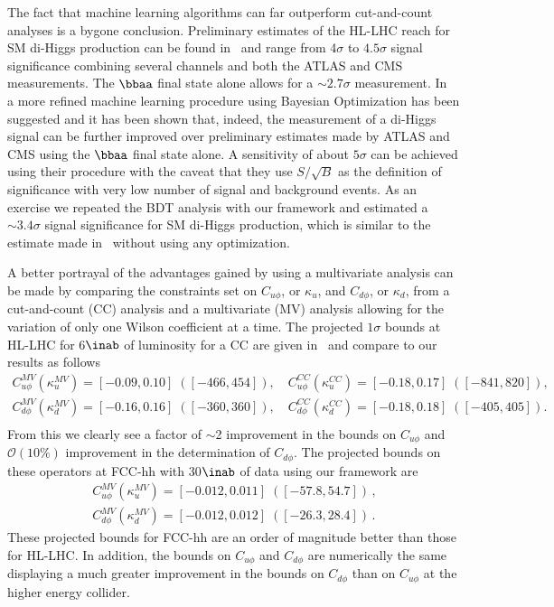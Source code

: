 
The fact that machine learning algorithms can far outperform cut-and-count analyses is a bygone conclusion. Preliminary estimates of the HL-LHC reach for SM di-Higgs production can be found in~\cite{Cepeda:2019klc} and range from 4$\sigma$ to $4.5\sigma$ signal significance combining several channels and both the ATLAS and CMS measurements. The $\bbaa$ final state alone allows for a $\sim2.7\sigma$ measurement. In~\cite{Alves:2017ued} a more refined machine learning procedure using Bayesian Optimization has been suggested and it has been shown that, indeed, the measurement of a di-Higgs signal can be further improved over preliminary estimates made by ATLAS and CMS using the $\bbaa$ final state alone. A sensitivity of about $5\sigma$ can be achieved using their procedure with the caveat that they use $S/\sqrt{B}$ as the definition of significance with very low number of signal and background events. As an exercise we repeated the BDT analysis with our framework and estimated a $\sim3.4\sigma$ signal significance for SM di-Higgs production, which is similar to the estimate made in~\cite{Alves:2017ued} without using any optimization. 

A better portrayal of the advantages gained by using a multivariate analysis can be made by comparing the constraints set on $C_{u\phi}$, or $\kappa_u$, and $C_{d\phi}$, or $\kappa_d$, from a cut-and-count (CC) analysis  and a multivariate (MV) analysis allowing for the variation of only one Wilson coefficient at a time. The projected $1\sigma$ bounds at HL-LHC for 6$\inab$ of luminosity for a CC are given in~\cite{Alasfar:2019pmn} and compare to our results as follows
\begin{eqnarray}
	C_{u\phi}^{MV} \left(\kappa_u^{MV}\right) = [-0.09, 0.10] \;([-466, 454]),\quad C_{u\phi}^{CC} (\kappa_u^{CC}) = [-0.18, 0.17] \;([-841, 820]), \nonumber\\
	C_{d\phi}^{MV} (\kappa_d^{MV}) = [-0.16, 0.16] \;([-360, 360]),\quad C_{d\phi}^{CC} (\kappa_d^{CC}) = [-0.18, 0.18] \;([-405, 405]). \nonumber\\
\end{eqnarray}
From this we clearly see a factor of $\sim$2 improvement in the bounds on $C_{u\phi}$ and $\mathcal O(10\%)$ improvement in the determination of $C_{d\phi}$. The projected bounds on these operators at FCC-hh with 30$\inab$ of data using our framework are
\begin{equation}
	\begin{split}
		C_{u\phi}^{MV} \left(\kappa_u^{MV}\right) = [-0.012, 0.011] \;([-57.8, 54.7])\,,\\
		C_{d\phi}^{MV} (\kappa_d^{MV}) = [-0.012, 0.012] \;([-26.3, 28.4])\,.
	\end{split}
\end{equation}
These projected bounds for FCC-hh are an order of magnitude better than those for HL-LHC. In addition, the bounds on $C_{u\phi}$ and $C_{d\phi}$ are numerically the same displaying a much greater improvement in the bounds on $C_{d\phi}$ than on $C_{u\phi}$ at the higher energy collider. 


